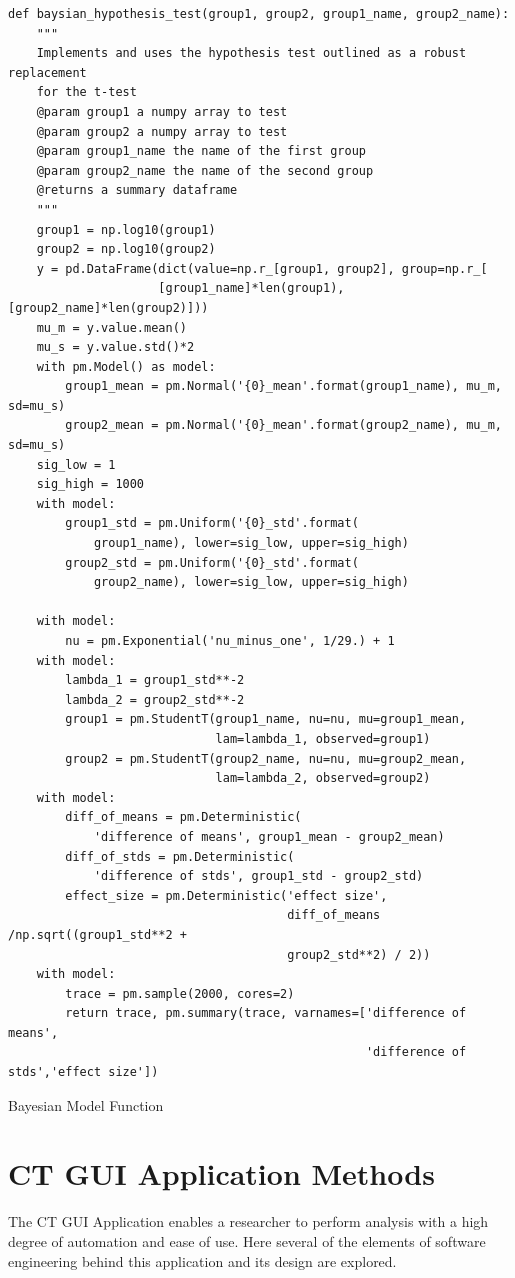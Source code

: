 \documentclass[11pt]{report}
\begin{document}
\begin{listing}[htbp]
\begin{verbatim}
def baysian_hypothesis_test(group1, group2, group1_name, group2_name):
    """
    Implements and uses the hypothesis test outlined as a robust replacement
    for the t-test
    @param group1 a numpy array to test
    @param group2 a numpy array to test
    @param group1_name the name of the first group
    @param group2_name the name of the second group
    @returns a summary dataframe
    """
    group1 = np.log10(group1)
    group2 = np.log10(group2)
    y = pd.DataFrame(dict(value=np.r_[group1, group2], group=np.r_[
                     [group1_name]*len(group1), [group2_name]*len(group2)]))
    mu_m = y.value.mean()
    mu_s = y.value.std()*2
    with pm.Model() as model:
        group1_mean = pm.Normal('{0}_mean'.format(group1_name), mu_m, sd=mu_s)
        group2_mean = pm.Normal('{0}_mean'.format(group2_name), mu_m, sd=mu_s)
    sig_low = 1
    sig_high = 1000
    with model:
        group1_std = pm.Uniform('{0}_std'.format(
            group1_name), lower=sig_low, upper=sig_high)
        group2_std = pm.Uniform('{0}_std'.format(
            group2_name), lower=sig_low, upper=sig_high)

    with model:
        nu = pm.Exponential('nu_minus_one', 1/29.) + 1
    with model:
        lambda_1 = group1_std**-2
        lambda_2 = group2_std**-2
        group1 = pm.StudentT(group1_name, nu=nu, mu=group1_mean,
                             lam=lambda_1, observed=group1)
        group2 = pm.StudentT(group2_name, nu=nu, mu=group2_mean,
                             lam=lambda_2, observed=group2)
    with model:
        diff_of_means = pm.Deterministic(
            'difference of means', group1_mean - group2_mean)
        diff_of_stds = pm.Deterministic(
            'difference of stds', group1_std - group2_std)
        effect_size = pm.Deterministic('effect size',
                                       diff_of_means /np.sqrt((group1_std**2 +
                                       group2_std**2) / 2))
    with model:
        trace = pm.sample(2000, cores=2)
        return trace, pm.summary(trace, varnames=['difference of means',
                                                  'difference of stds','effect size'])
\end{verbatim}
\caption{\label{orge62e383}
Bayesian Model Function}
\end{listing}


\clearpage


\section{CT GUI Application Methods}
\label{sec:orge25a23c}
The CT GUI Application enables a researcher to perform analysis with a high degree of automation and ease of use. Here several of the elements of software engineering behind this application and its design are explored.
\end{document}
